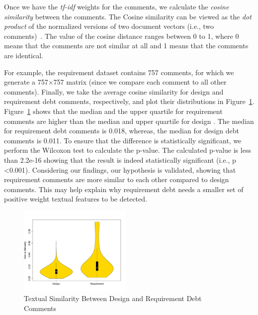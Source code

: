 Once we have the \textit{tf-idf} weights for the comments, we calculate the \textit{cosine similarity} between the comments. The Cosine similarity can be viewed as the \textit{dot product} of the normalized versions of two document vectors (i.e., two comments)~\cite{Manning2008book}. The value of the cosine distance ranges between 0 to 1, where 0 means that the comments are not similar at all and 1 means that the comments are identical.

For example, the requirement \SATD dataset contains 757 comments, for which we generate a 757$\times$757 matrix (since we compare each comment to all other comments).
Finally, we take the average cosine similarity for design and requirement debt comments, respectively, and plot their distributions in Figure~\ref{fig:textual_similarity}.
Figure~\ref{fig:textual_similarity} shows that the median and the upper quartile for requirement \SATD comments are higher than the median and upper quartile for design \SATD.
The median for requirement debt comments is 0.018, whereas, the median for design debt comments is 0.011.
To ensure that the difference is statistically significant, we perform the Wilcoxon test to calculate the p-value. The calculated p-value is less than 2.2e-16 showing that the result is indeed statistically significant (i.e., p \textless 0.001). Considering our findings, our hypothesis is validated, showing that requirement \SATD comments are more similar to each other compared to design \SATD comments. This may help explain why requirement debt needs a smaller set of positive weight textual features to be detected.

\begin{figure}[t]
  \centering
  \includegraphics[width = 0.48\textwidth]{figures/textual_similarity_removing_stop_words.pdf}
  \vspace{-3mm}
  \caption{Textual Similarity Between Design and Requirement Debt Comments}
  \label{fig:textual_similarity}
\end{figure}

